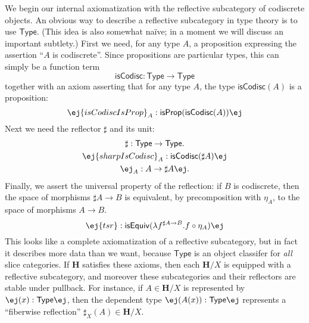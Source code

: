 \documentclass[copyright,12pt]{eptcs}
\makeatletter
\newcommand{\type}{\ensuremath{\mathsf{Type}}\xspace}
\newcommand{\ig}{\ensuremath{\infty\text{-}\mathbf{Gpd}}\xspace}
\renewcommand{\H}{\ensuremath{\mathbf{H}}\xspace}
\newcommand{\io}{\ensuremath{(\infty,1)}}
\newcommand{\sharpsub}[1]{\sharp_{\scriptscriptstyle #1}}
\def\jd#1{\@jd#1\ej}
\def\@jd#1|-#2\ej{\@@jd#1,,\;\vdash\;\left(#2\right)}
\def\@@jd#1,{\@ifmtarg{#1}{\let\next=\relax}{\left(#1\right)\let\next=\@@@jd}\next}
\def\@@@jd#1,{\@ifmtarg{#1}{\let\next=\relax}{,\,\left(#1\right)\let\next=\@@@jd}\next}
\makeatother
\begin{document}

We begin our internal axiomatization with the reflective subcategory of codiscrete objects.
An obvious
way to describe a reflective subcategory in type theory is to use \type.
(This idea is also somewhat na\"ive; in a moment we will discuss an important subtlety.)
First we need, for any type $A$, a proposition expressing the assertion ``$A$ is codiscrete''.
Since propositions are particular types, this can simply be a function term
\begin{equation}
  \mathsf{isCodisc} : \type \to \type
\end{equation}
together with an axiom asserting that for any type $A$, the type $\mathsf{isCodisc}(A)$ is a proposition:
\begin{equation}
  \jd{A:\type |- \mathsf{isCodiscIsProp}_A : \mathsf{isProp} (\mathsf{isCodisc}(A))}
\end{equation}
Next we need the reflector $\sharp$ and its unit:
\begin{gather}
\sharp : \type\to\type.\\
\jd{A:\type |- \mathsf{sharpIsCodisc}_A : \mathsf{isCodisc}(\sharp A)}\\
  \jd{A:\type |- \eta_A : A \to \sharp A}.  \label{SharpUnit}
\end{gather}
Finally, we assert the universal property of the reflection: if $B$ is codiscrete, then the space of morphisms $\sharp A \to B$ is equivalent, by precomposition with $\eta_A$, to the space of morphisms $A\to B$.
\begin{equation}
  \jd{A:\type, B:\type, \mathsf{bc} : \mathsf{isCodisc}(B) |-
    \mathsf{tsr} : \mathsf{isEquiv} (\lambda f^{\sharp A\to B}. f\circ \eta_A)
  }\label{eq:tsr}
\end{equation}
This looks like a complete axiomatization of a reflective subcategory, but in fact it describes more data than we want, because \type is an object classifer for \emph{all} slice categories.
If \H satisfies these axioms, then each $\H/X$ is equipped with a reflective subcategory, and moreover these subcategories and their reflectors are stable under pullback.
For instance, if $A\in\H/X$ is represented by $\jd{x:X |- A(x):\type}$, then the dependent type $\jd{x:X |- \sharp(A(x)):\type}$ represents a ``fiberwise reflection'' $\sharpsub{X}(A) \in \H/X$.
\end{document}
